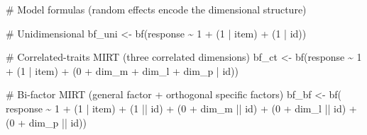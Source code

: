 \documentclass[
  man,
  floatsintext,
  longtable,
  nolmodern,
  notxfonts,
  notimes,
  colorlinks=true,linkcolor=blue,citecolor=blue,urlcolor=blue]{apa7}
\newenvironment{Shaded}{\begin{snugshade}}{\end{snugshade}}
\newcommand{\CommentTok}[1]{\textcolor[rgb]{0.37,0.37,0.37}{#1}}
\newcommand{\DecValTok}[1]{\textcolor[rgb]{0.68,0.00,0.00}{#1}}
\newcommand{\FunctionTok}[1]{\textcolor[rgb]{0.28,0.35,0.67}{#1}}
\newcommand{\NormalTok}[1]{\textcolor[rgb]{0.00,0.23,0.31}{#1}}
\newcommand{\OtherTok}[1]{\textcolor[rgb]{0.00,0.23,0.31}{#1}}
\newcommand{\SpecialCharTok}[1]{\textcolor[rgb]{0.37,0.37,0.37}{#1}}
\begin{document}
\begin{Shaded}
\begin{Highlighting}[]
\CommentTok{\# Model formulas (random effects encode the dimensional structure)}

\CommentTok{\# Unidimensional}
\NormalTok{bf\_uni }\OtherTok{\textless{}{-}} \FunctionTok{bf}\NormalTok{(response }\SpecialCharTok{\textasciitilde{}} \DecValTok{1} \SpecialCharTok{+}\NormalTok{ (}\DecValTok{1} \SpecialCharTok{|}\NormalTok{ item) }\SpecialCharTok{+}\NormalTok{ (}\DecValTok{1} \SpecialCharTok{|}\NormalTok{ id))}

\CommentTok{\# Correlated{-}traits MIRT (three correlated dimensions)}
\NormalTok{bf\_ct }\OtherTok{\textless{}{-}} \FunctionTok{bf}\NormalTok{(response }\SpecialCharTok{\textasciitilde{}} \DecValTok{1} \SpecialCharTok{+}\NormalTok{ (}\DecValTok{1} \SpecialCharTok{|}\NormalTok{ item) }\SpecialCharTok{+}\NormalTok{ (}\DecValTok{0} \SpecialCharTok{+}\NormalTok{ dim\_m }\SpecialCharTok{+}\NormalTok{ dim\_l }\SpecialCharTok{+}\NormalTok{ dim\_p }\SpecialCharTok{|}\NormalTok{ id))}

\CommentTok{\# Bi{-}factor MIRT (general factor + orthogonal specific factors)}
\NormalTok{bf\_bf }\OtherTok{\textless{}{-}} \FunctionTok{bf}\NormalTok{(}
\NormalTok{  response }\SpecialCharTok{\textasciitilde{}} \DecValTok{1} \SpecialCharTok{+}\NormalTok{ (}\DecValTok{1} \SpecialCharTok{|}\NormalTok{ item) }\SpecialCharTok{+}\NormalTok{ (}\DecValTok{1} \SpecialCharTok{||}\NormalTok{ id) }\SpecialCharTok{+}
\NormalTok{    (}\DecValTok{0} \SpecialCharTok{+}\NormalTok{ dim\_m }\SpecialCharTok{||}\NormalTok{ id) }\SpecialCharTok{+}\NormalTok{ (}\DecValTok{0} \SpecialCharTok{+}\NormalTok{ dim\_l }\SpecialCharTok{||}\NormalTok{ id) }\SpecialCharTok{+}\NormalTok{ (}\DecValTok{0} \SpecialCharTok{+}\NormalTok{ dim\_p }\SpecialCharTok{||}\NormalTok{ id))}


\end{Highlighting}
\end{Shaded}
\end{document}
